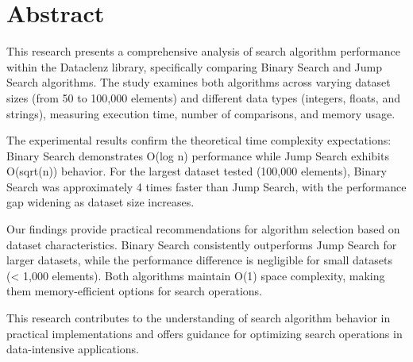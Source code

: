\chapter*{Abstract}

This research presents a comprehensive analysis of search algorithm performance within the Dataclenz library, specifically comparing Binary Search and Jump Search algorithms. The study examines both algorithms across varying dataset sizes (from 50 to 100,000 elements) and different data types (integers, floats, and strings), measuring execution time, number of comparisons, and memory usage.

The experimental results confirm the theoretical time complexity expectations: Binary Search demonstrates O(log n) performance while Jump Search exhibits O(sqrt(n)) behavior. For the largest dataset tested (100,000 elements), Binary Search was approximately 4 times faster than Jump Search, with the performance gap widening as dataset size increases.

Our findings provide practical recommendations for algorithm selection based on dataset characteristics. Binary Search consistently outperforms Jump Search for larger datasets, while the performance difference is negligible for small datasets (< 1,000 elements). Both algorithms maintain O(1) space complexity, making them memory-efficient options for search operations.

This research contributes to the understanding of search algorithm behavior in practical implementations and offers guidance for optimizing search operations in data-intensive applications.


